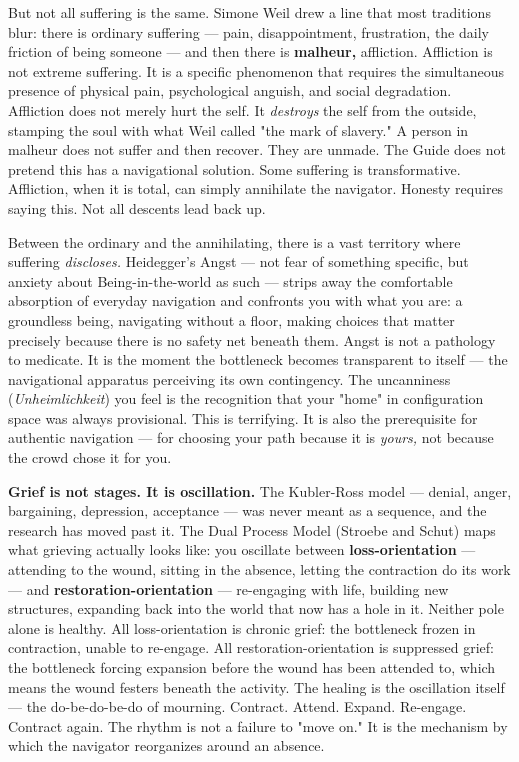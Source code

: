 But not all suffering is the same. Simone Weil drew a line that most traditions blur: there is ordinary suffering — pain, disappointment, frustration, the daily friction of being someone — and then there is \textbf{malheur,} affliction. Affliction is not extreme suffering. It is a specific phenomenon that requires the simultaneous presence of physical pain, psychological anguish, and social degradation. Affliction does not merely hurt the self. It \textit{destroys} the self from the outside, stamping the soul with what Weil called "the mark of slavery." A person in malheur does not suffer and then recover. They are unmade. The Guide does not pretend this has a navigational solution. Some suffering is transformative. Affliction, when it is total, can simply annihilate the navigator. Honesty requires saying this. Not all descents lead back up.


Between the ordinary and the annihilating, there is a vast territory where suffering \textit{discloses.} Heidegger's Angst — not fear of something specific, but anxiety about Being-in-the-world as such — strips away the comfortable absorption of everyday navigation and confronts you with what you are: a groundless being, navigating without a floor, making choices that matter precisely because there is no safety net beneath them. Angst is not a pathology to medicate. It is the moment the bottleneck becomes transparent to itself — the navigational apparatus perceiving its own contingency. The uncanniness (\textit{Unheimlichkeit}) you feel is the recognition that your "home" in configuration space was always provisional. This is terrifying. It is also the prerequisite for authentic navigation — for choosing your path because it is \textit{yours,} not because the crowd chose it for you.


\textbf{Grief is not stages. It is oscillation.} The Kubler-Ross model — denial, anger, bargaining, depression, acceptance — was never meant as a sequence, and the research has moved past it. The Dual Process Model (Stroebe and Schut) maps what grieving actually looks like: you oscillate between \textbf{loss-orientation} — attending to the wound, sitting in the absence, letting the contraction do its work — and \textbf{restoration-orientation} — re-engaging with life, building new structures, expanding back into the world that now has a hole in it. Neither pole alone is healthy. All loss-orientation is chronic grief: the bottleneck frozen in contraction, unable to re-engage. All restoration-orientation is suppressed grief: the bottleneck forcing expansion before the wound has been attended to, which means the wound festers beneath the activity. The healing is the oscillation itself — the do-be-do-be-do of mourning. Contract. Attend. Expand. Re-engage. Contract again. The rhythm is not a failure to "move on." It is the mechanism by which the navigator reorganizes around an absence.


